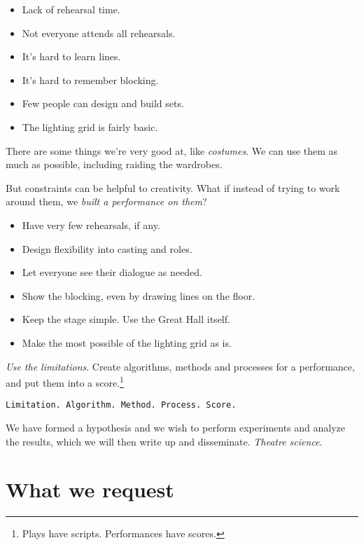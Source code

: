 \documentclass[12pt]{article}
\begin{document}
\begin{itemize}

  \item Lack of rehearsal time.
  \item Not everyone attends all rehearsals.
  \item It's hard to learn lines.
  \item It's hard to remember blocking.
  \item Few people can design and build sets.
  \item The lighting grid is fairly basic.

\end{itemize}

There are some things we're very good at, like \textit{costumes}.  We can use them as much as possible, including raiding the wardrobes.

But constraints can be helpful to creativity.  What if instead of trying to work around them, we \textit{built a performance on them}?

\begin{itemize}

  \item Have very few rehearsals, if any.
  \item Design flexibility into casting and roles.
  \item Let everyone see their dialogue as needed.
  \item Show the blocking, even by drawing lines on the floor.
  \item Keep the stage simple.  Use the Great Hall itself.
  \item Make the most possible of the lighting grid as is.

\end{itemize}

\textit{Use the limitations}.  Create algorithms, methods and processes for a performance, and put them into a score.\footnote{Plays have scripts.  Performances have scores.}

\texttt{Limitation.  Algorithm.  Method.  Process. Score.}

We have formed a hypothesis and we wish to perform experiments and analyze the results, which we will then write up and disseminate. \textit{Theatre science}.

\section{What we request}
\end{document}

